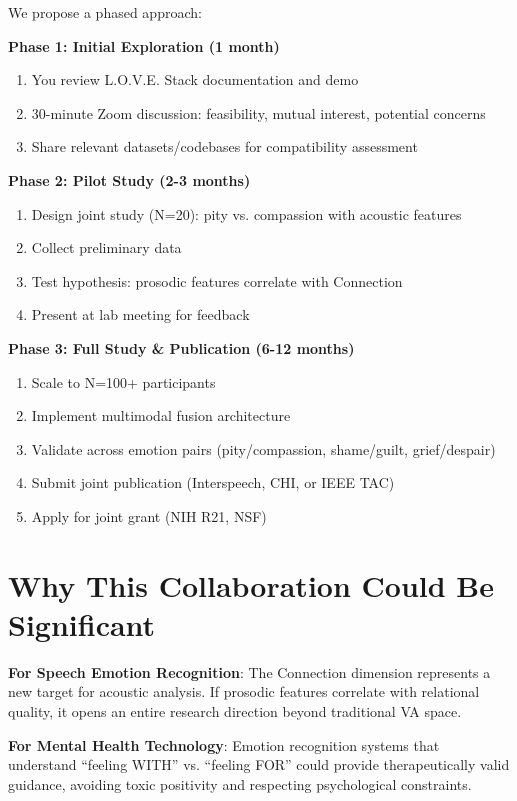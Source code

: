 \documentclass[11pt]{article}
\begin{document}
We propose a phased approach:

\textbf{Phase 1: Initial Exploration (1 month)}
\begin{enumerate}
    \item You review L.O.V.E. Stack documentation and demo
    \item 30-minute Zoom discussion: feasibility, mutual interest, potential concerns
    \item Share relevant datasets/codebases for compatibility assessment
\end{enumerate}

\textbf{Phase 2: Pilot Study (2-3 months)}
\begin{enumerate}
    \item Design joint study (N=20): pity vs. compassion with acoustic features
    \item Collect preliminary data
    \item Test hypothesis: prosodic features correlate with Connection
    \item Present at lab meeting for feedback
\end{enumerate}

\textbf{Phase 3: Full Study \& Publication (6-12 months)}
\begin{enumerate}
    \item Scale to N=100+ participants
    \item Implement multimodal fusion architecture
    \item Validate across emotion pairs (pity/compassion, shame/guilt, grief/despair)
    \item Submit joint publication (Interspeech, CHI, or IEEE TAC)
    \item Apply for joint grant (NIH R21, NSF)
\end{enumerate}

\section{Why This Collaboration Could Be Significant}

\textbf{For Speech Emotion Recognition}: The Connection dimension represents a new target for acoustic analysis. If prosodic features correlate with relational quality, it opens an entire research direction beyond traditional VA space.

\textbf{For Mental Health Technology}: Emotion recognition systems that understand ``feeling WITH'' vs. ``feeling FOR'' could provide therapeutically valid guidance, avoiding toxic positivity and respecting psychological constraints.
\end{document}
